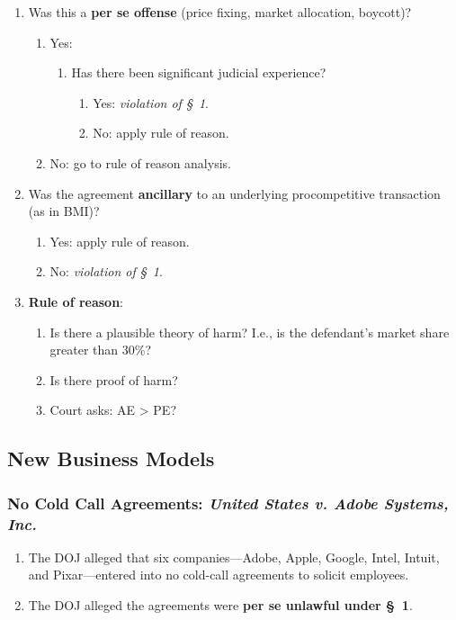 \begin{enumerate}
    \item Was this a \textbf{per se offense} (price fixing, market allocation, 
    boycott)?
    \begin{enumerate}
        \item Yes:
        \begin{enumerate}
            \item Has there been significant judicial experience?
            \begin{enumerate}
                \item Yes: \emph{violation of \S\ 1}.
                \item No: apply rule of reason.
            \end{enumerate}
        \end{enumerate}
        \item No: go to rule of reason analysis.
    \end{enumerate}
    \item Was the agreement \textbf{ancillary} to an underlying procompetitive 
    transaction (as in BMI)?
    \begin{enumerate}
        \item Yes: apply rule of reason.
        \item No: \emph{violation of \S\ 1}.
    \end{enumerate}
    \item \textbf{Rule of reason}:
    \begin{enumerate}
        \item Is there a plausible theory of harm? I.e., is the defendant's 
        market share greater than 30\%?
        \item Is there proof of harm?
        \item Court asks: AE > PE?
    \end{enumerate}
\end{enumerate}

\subsection{New Business Models}

\subsubsection{No Cold Call Agreements: \emph{United States v. Adobe Systems, 
Inc.}}

\begin{enumerate}
    \item The DOJ alleged that six companies---Adobe, Apple, Google, Intel, 
    Intuit, and Pixar---entered into no cold-call agreements to solicit 
    employees.
    \item The DOJ alleged the agreements were \textbf{per se unlawful under \S\ 
    1}.
\end{enumerate}

